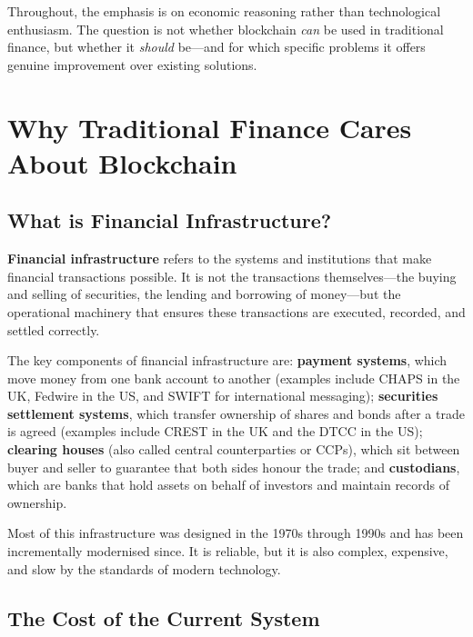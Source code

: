 \documentclass[11pt,a4paper]{article}
\newcommand{\keyword}[1]{\textbf{\textcolor{AccentOrange}{#1}}}
\begin{document}
Throughout, the emphasis is on economic reasoning rather than technological enthusiasm. The question is not whether blockchain \textit{can} be used in traditional finance, but whether it \textit{should} be---and for which specific problems it offers genuine improvement over existing solutions.

\section{Why Traditional Finance Cares About Blockchain}

\subsection{What is Financial Infrastructure?}

\keyword{Financial infrastructure} refers to the systems and institutions that make financial transactions possible. It is not the transactions themselves---the buying and selling of securities, the lending and borrowing of money---but the operational machinery that ensures these transactions are executed, recorded, and settled correctly.

The key components of financial infrastructure are: \keyword{payment systems}, which move money from one bank account to another (examples include CHAPS in the UK, Fedwire in the US, and SWIFT for international messaging); \keyword{securities settlement systems}, which transfer ownership of shares and bonds after a trade is agreed (examples include CREST in the UK and the DTCC in the US); \keyword{clearing houses} (also called central counterparties or CCPs), which sit between buyer and seller to guarantee that both sides honour the trade; and \keyword{custodians}, which are banks that hold assets on behalf of investors and maintain records of ownership.

Most of this infrastructure was designed in the 1970s through 1990s and has been incrementally modernised since. It is reliable, but it is also complex, expensive, and slow by the standards of modern technology.

\subsection{The Cost of the Current System}
\end{document}
